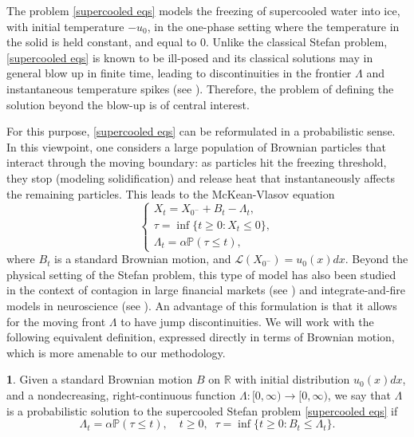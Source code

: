 \documentclass{article}
\numberwithin{equation}{section}
\numberwithin{figure}{section}
\theoremstyle{plain}
\theoremstyle{plain}
\theoremstyle{plain}
\theoremstyle{plain}
\theoremstyle{definition}
\newtheorem{defn}[thm]{\protect\definitionname}
\theoremstyle{remark}
\def\R{{\mathbb{R}}}
\def\P{{\mathbb{P}}}
\providecommand{\definitionname}{Definition}
\begin{document}
The problem \eqref{supercooled eqs} models the freezing of supercooled water into ice, with initial temperature $-u_0$, in the one-phase setting where the temperature in the solid is held constant, and equal to $0$. Unlike the classical Stefan problem, \eqref{supercooled eqs} is known to be ill-posed and its classical solutions may in general blow up in finite time, leading to discontinuities in the frontier $\Lambda$ and instantaneous temperature spikes (see \cite{sherman}). Therefore, the problem of defining the solution beyond the blow-up is of central interest.

For this purpose, \eqref{supercooled eqs} can be reformulated in a probabilistic sense.  In this viewpoint, one considers a large population of Brownian particles that interact through the moving boundary: as particles hit the freezing threshold, they stop (modeling solidification) and release heat that instantaneously affects the remaining particles. This leads to the McKean-Vlasov equation
\begin{equation}
    \begin{cases}X_t=X_{0^-}+B_t-\Lambda_t, \\
\tau=\inf\{t\geq 0: X_t \leq 0\},\\
\Lambda_t=\alpha \P(\tau \leq t), 
 \end{cases}
\end{equation}
where $B_t$ is a standard Brownian motion, and $\mathcal{L}(X_{0^-})=u_0(x)dx$. Beyond the physical setting of the Stefan problem, this type of model has also been studied in the context of contagion in large financial markets (see \cite{hambly,HamSoj,LedSoj2,NadShk,NadShk2}) and integrate-and-fire models in neuroscience (see \cite{CarPerSalSme,DelIngRubTan,IngTal}). An advantage of this formulation is that it allows for the moving front $\Lambda$ to have jump discontinuities. We will work with the following equivalent definition, expressed directly in terms of Brownian motion, which is more amenable to our methodology.

\begin{defn} \label{def: probabilistic} Given a standard Brownian motion $B$ on $\R$ with initial distribution $u_0(x)dx$, and a nondecreasing, right-continuous function $\Lambda:[0,\infty) \to [0,\infty)$, we say that $\Lambda$ is a probabilistic solution to the supercooled Stefan problem \eqref{supercooled eqs} if
\begin{equation} 
\Lambda_t=\alpha\P(\tau \leq t), \quad  t\geq0, \;\;\tau=\inf\{t\geq0: B_t \leq \Lambda_t\}.
\end{equation}\end{defn}
\end{document}
